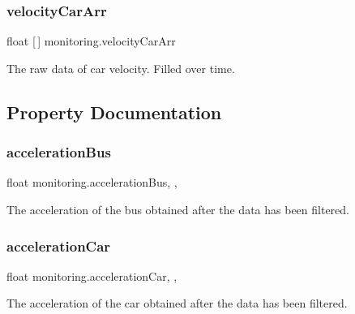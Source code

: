 \subsubsection{\texorpdfstring{velocity\+Car\+Arr}{velocityCarArr}}
{\footnotesize\ttfamily float \mbox{[}$\,$\mbox{]} monitoring.\+velocity\+Car\+Arr\hspace{0.3cm}{\ttfamily [private]}}



The raw data of car velocity. Filled over time.



\subsection{Property Documentation}
\mbox{\label{classmonitoring_aa570e9f19b8dac133c43bb5f3c1ae2a3}} 
\subsubsection{\texorpdfstring{acceleration\+Bus}{accelerationBus}}
{\footnotesize\ttfamily float monitoring.\+acceleration\+Bus\hspace{0.3cm}{\ttfamily [static]}, {\ttfamily [get]}, {}}



The acceleration of the bus obtained after the data has been filtered.

\mbox{\label{classmonitoring_aaaf8354f9953bda4e43e4f0b66923467}} 
\subsubsection{\texorpdfstring{acceleration\+Car}{accelerationCar}}
{\footnotesize\ttfamily float monitoring.\+acceleration\+Car\hspace{0.3cm}{\ttfamily [static]}, {\ttfamily [get]}, {}}



The acceleration of the car obtained after the data has been filtered.

\mbox{\label{classmonitoring_a8e2c4ef74df749bdc13e8a29c066eb6b}} 

